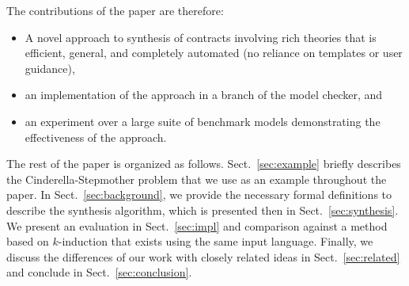 \iffalse
We evaluate the fixpoint algorithm against the $k$-inductive approach using a comprehensive benchmark suite containing contracts that were initially used in verification problems, as well as specification for industrial-level designs and versions of the ``Cinderella'' problem from~\cite{beyene2014constraint}.  The experiment demonstrates that this approach is a direct improvement over the $k$-inductive method in two important aspects: performance and generality.  On all models that can be synthesized by $k$-induction, the new algorithm always outperforms the $k$-inductive algorithm in terms of time required for synthesis (on average, 53.64\% faster) while yielding roughly approximate code sizes and execution times for the generated C code.  The new algorithm can synthesize a strictly larger set of benchmark models, and comes with an improved termination guarantee: unlike the $k$-inductive algorithm, if the algorithm terminates with an `unrealizable' result, then there is no possible realization of the contract.
\fi

The contributions of the paper are therefore:
\begin{itemize}
    \item A novel approach to synthesis of contracts involving rich theories that is efficient, general, and completely automated (no reliance on templates or user guidance),
    \item an implementation of the approach in a branch of the \jkind model checker, and
    \item an experiment over a large suite of benchmark models demonstrating the effectiveness of the approach.
\end{itemize}

The rest of the paper is organized as follows. Sect.~\ref{sec:example} briefly describes the Cinderella-Stepmother problem that we use as an example throughout the paper. In Sect.~\ref{sec:background}, we provide the necessary formal definitions to describe the synthesis algorithm, which is presented then in Sect.~\ref{sec:synthesis}.
We present an evaluation in Sect.~\ref{sec:impl} and comparison against a method based on $k$-induction that exists using the same input language.
Finally, we discuss the differences of our work with closely related ideas in Sect.~\ref{sec:related} and conclude in Sect.~\ref{sec:conclusion}.

	
